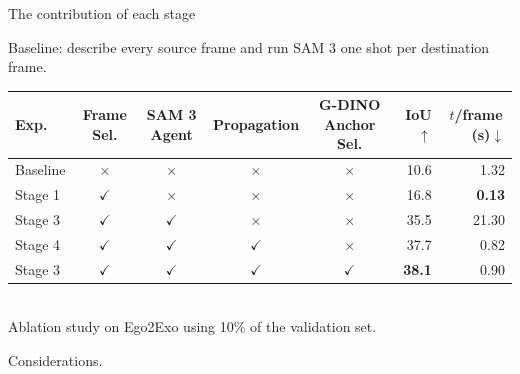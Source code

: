 \documentclass[professionalfonts,aspectratio=169]{beamer}
\begin{document}
\begin{frame}[t]
\begin{center}
{\large The contribution of each stage}
\end{center}
\vfill
\begin{center}
    Baseline: describe every source frame and run SAM 3 one shot per destination frame.
    \\[2.0em]
    \footnotesize
    \setlength{\tabcolsep}{5pt}
    \begin{tabular}{lccccrr}
      \toprule
      Exp. & Frame Sel. & SAM 3 Agent & Propagation & G-DINO Anchor Sel. & IoU$\uparrow$ & $t$/frame\,(s)$\downarrow$ \\
      \midrule
      Baseline          & $\times$ & $\times$ & $\times$ & $\times$ & 10.6 & 1.32 \\
      \midrule
      Stage 1 & $\checkmark$ & $\times$ & $\times$ & $\times$ & 16.8 & \textbf{0.13} \\
      Stage 3 & $\checkmark$ & $\checkmark$ & $\times$ & $\times$ & 35.5 & 21.30 \\
      Stage 4 & $\checkmark$ & $\checkmark$ & $\checkmark$ & $\times$ & 37.7 & 0.82 \\
      Stage 3 & $\checkmark$ & $\checkmark$ & $\checkmark$ & $\checkmark$ & \textbf{38.1} & 0.90 \\
      \bottomrule
    \end{tabular}
    \\[0.8em]
    {\normalsize Ablation study on Ego2Exo using 10\% of the validation set.}
\end{center}
\vfill
\end{frame}

\begin{frame}
  \begin{center}
      {\Large Considerations.}
  \end{center}
  \end{frame}
\end{document}
